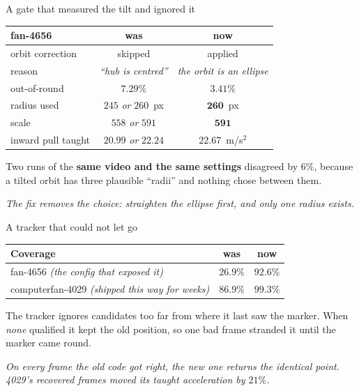 \documentclass[aspectratio=169,10pt]{beamer}
\newcommand{\takeaway}[1]{\vfill{\footnotesize\itshape\color{cGrey}#1\par}}
\begin{document}
\begin{frame}{A gate that measured the tilt and ignored it}
\vfill
\begin{center}
\small
\renewcommand{\arraystretch}{1.35}
\begin{tabular}{@{}lcc@{}}
\toprule
\rowcolor{cInfra!12}
\textbf{fan-4656} & \textbf{was} & \textbf{now} \\
\midrule
orbit correction & {\color{cAccent}skipped} & {\color{cApp}applied} \\
reason & \emph{``hub is centred''} & \emph{the orbit is an ellipse} \\
out-of-round & $7.29\%$ & $\mathbf{3.41\%}$ \\
\midrule
radius used & $245$ \emph{or} $260$~px & $\mathbf{260}$~px \\
scale & $558$ \emph{or} $591$ & $\mathbf{591}$ \\
inward pull taught & $20.99$ \emph{or} $22.24$ & $\mathbf{22.67}$~m/s$^2$ \\
\bottomrule
\end{tabular}
\end{center}
\vfill
\begin{center}
{\footnotesize Two runs of the \textbf{same video and the same settings} disagreed by $6\%$,
because a tilted orbit has three plausible ``radii'' and nothing chose between them.}
\end{center}
\takeaway{The fix removes the choice: straighten the ellipse first, and only one radius exists.}
\end{frame}

\begin{frame}{A tracker that could not let go}
\vfill
\begin{center}
\small
\renewcommand{\arraystretch}{1.4}
\begin{tabular}{@{}lcc@{}}
\toprule
\rowcolor{cInfra!12}
\textbf{Coverage} & \textbf{was} & \textbf{now} \\
\midrule
fan-4656 \emph{(the config that exposed it)} & $26.9\%$ & $\mathbf{92.6\%}$ \\
computerfan-4029 \emph{(shipped this way for weeks)} & $86.9\%$ & $\mathbf{99.3\%}$ \\
\bottomrule
\end{tabular}
\end{center}
\vfill
\begin{center}
{\footnotesize The tracker ignores candidates too far from where it last saw the marker. When
\emph{none} qualified it kept the old position, so one bad frame stranded it until the marker
came round.}
\end{center}
\takeaway{On every frame the old code got right, the new one returns the identical point. 4029's
recovered frames moved its taught acceleration by $21\%$.}
\end{frame}
\end{document}
